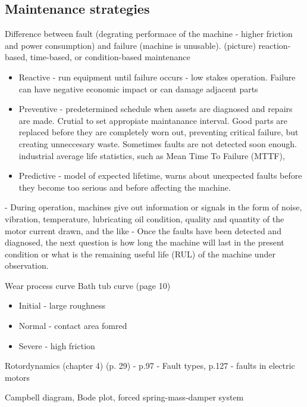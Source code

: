 \subsection{Maintenance strategies}
\cite{mohanty_machinery_2015}
Difference between fault (degrating performace of the machine - higher friction and power consumption) and failure (machine is unusable). (picture)
reaction-based, time-based, or condition-based maintenance
\begin{itemize}
\item Reactive - run equipment until failure occurs - low stakes operation. Failure can have negative economic impact or can damage adjacent parts
\item Preventive - predetermined schedule when assets are diagnosed and repairs are made. Crutial to set appropiate maintanance interval. Good parts are replaced before they are completely worn out, preventing critical failure, but creating unneccesary waste. Sometimes faults are not detected soon enough. industrial average life statistics, such as Mean Time To Failure (MTTF),
\item Predictive - model of expected lifetime, warns about unexpected faults before they become too serious and before affecting the machine.
\end{itemize}

- During operation, machines give out information or signals in the form of noise, vibration, temperature, lubricating oil condition, quality and quantity of the motor current drawn, and the like
- Once the faults have been detected and diagnosed, the next question is how long the machine will last in the present condition or what is the remaining useful life (RUL) of the machine under observation.

Wear process curve \cite{mohanty_machinery_2015} Bath tub curve (page 10)
\begin{itemize}
	\item Initial - large roughness
	\item Normal - contact area fomred
	\item Severe - high friction
\end{itemize}

Rotordynamics (chapter 4) (p. 29)  - p.97 - Fault types, p.127 - faults in electric motors

Campbell diagram, Bode plot, forced spring-mass-damper system

